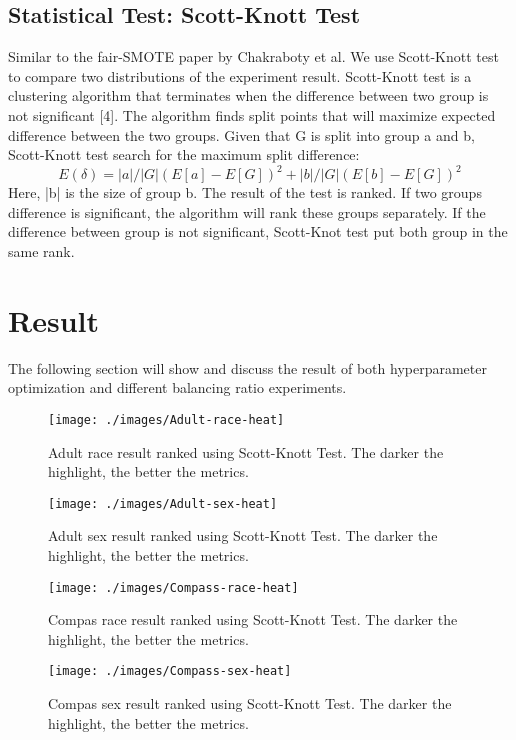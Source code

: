 \documentclass[sigconf]{acmart}
\begin{document}
\subsection{Statistical Test: Scott-Knott Test}
Similar to the fair-SMOTE paper by Chakraboty et al. We use Scott-Knott test to compare two distributions of the experiment result. Scott-Knott test is a clustering algorithm that terminates when the difference between two group is not significant [4]. The algorithm finds split points that will maximize expected difference between the two groups. Given that G is split into group a and b, Scott-Knott test search for the maximum split difference:
\[E(\delta) = |a|/|G|(E[a]-E[G])^2 + |b|/|G|(E[b]-E[G])^2\]
Here, |b| is the size of group b. The result of the test is ranked. If two groups difference is significant, the algorithm will rank these groups separately. If the difference between group is not significant, Scott-Knot test put both group in the same rank. 

\section{Result}

The following section will show and discuss the result of both hyperparameter optimization and different balancing ratio experiments. 

\begin{figure*}[t]
  \centering
  \texttt{[image: ./images/Adult-race-heat]}
  \caption{Adult race result ranked using Scott-Knott Test. The darker the highlight, the better the metrics.}
\end{figure*}
\begin{figure*}[t]
  \centering
  \texttt{[image: ./images/Adult-sex-heat]}
  \caption{Adult sex result ranked using Scott-Knott Test. The darker the highlight, the better the metrics.}
\end{figure*}
\begin{figure*}[t]
  \centering
  \texttt{[image: ./images/Compass-race-heat]}
  \caption{Compas race result ranked using Scott-Knott Test. The darker the highlight, the better the metrics.}
\end{figure*}
\begin{figure*}[t]
  \centering
  \texttt{[image: ./images/Compass-sex-heat]}
  \caption{Compas sex result ranked using Scott-Knott Test. The darker the highlight, the better the metrics.}
\end{figure*}
\end{document}
